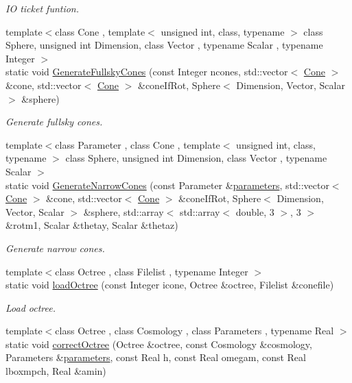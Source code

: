 \begin{DoxyCompactItemize}
\begin{DoxyCompactList}\small\item\em I\-O ticket funtion. \end{DoxyCompactList}\item 
{\footnotesize template$<$class Cone , template$<$ unsigned int, class, typename $>$ class Sphere, unsigned int Dimension, class Vector , typename Scalar , typename Integer $>$ }\\static void \hyperlink{classMiscellaneous_a778d3849588f691aee744494cad9d6f3}{Generate\-Fullsky\-Cones} (const Integer ncones, std\-::vector$<$ \hyperlink{exceptionCone}{Cone} $>$ \&cone, std\-::vector$<$ \hyperlink{exceptionCone}{Cone} $>$ \&cone\-If\-Rot, Sphere$<$ Dimension, Vector, Scalar $>$ \&sphere)
\begin{DoxyCompactList}\small\item\em Generate fullsky cones. \end{DoxyCompactList}\item 
{\footnotesize template$<$class Parameter , class Cone , template$<$ unsigned int, class, typename $>$ class Sphere, unsigned int Dimension, class Vector , typename Scalar $>$ }\\static void \hyperlink{classMiscellaneous_a2c23a764d6444a004f05cf946b9d323b}{Generate\-Narrow\-Cones} (const Parameter \&\hyperlink{rays_8h_ae1bc8b0b8c8b9f8e4cc61a5cc7c4ce9e}{parameters}, std\-::vector$<$ \hyperlink{exceptionCone}{Cone} $>$ \&cone, std\-::vector$<$ \hyperlink{exceptionCone}{Cone} $>$ \&cone\-If\-Rot, Sphere$<$ Dimension, Vector, Scalar $>$ \&sphere, std\-::array$<$ std\-::array$<$ double, 3 $>$, 3 $>$ \&rotm1, Scalar \&thetay, Scalar \&thetaz)
\begin{DoxyCompactList}\small\item\em Generate narrow cones. \end{DoxyCompactList}\item 
{\footnotesize template$<$class Octree , class Filelist , typename Integer $>$ }\\static void \hyperlink{classMiscellaneous_a3c3ccb25be62b21d59c596194dec2f51}{load\-Octree} (const Integer icone, Octree \&octree, Filelist \&conefile)
\begin{DoxyCompactList}\small\item\em Load octree. \end{DoxyCompactList}\item 
{\footnotesize template$<$class Octree , class Cosmology , class Parameters , typename Real $>$ }\\static void \hyperlink{classMiscellaneous_a06da9d999b2700f784502ba93899029b}{correct\-Octree} (Octree \&octree, const Cosmology \&cosmology, Parameters \&\hyperlink{rays_8h_ae1bc8b0b8c8b9f8e4cc61a5cc7c4ce9e}{parameters}, const Real h, const Real omegam, const Real lboxmpch, Real \&amin)

\end{DoxyCompactItemize}
